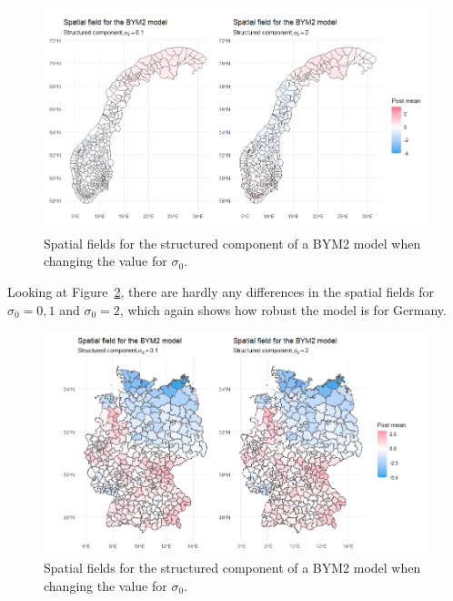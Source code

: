 \begin{figure}[H]
  \centering
  \includegraphics[width = \textwidth]{spatial_field_norway_3.png}
  \caption{Spatial fields for the structured component of a BYM2 model when changing the value for $\sigma_0$.}
  \label{comparison_norway_8}
\end{figure}
Looking at Figure~\ref{comparison_germany_8}, there are hardly any differences in the spatial fields for $\sigma_0=0,1$ and $\sigma_0=2$, which again shows how robust the model is for Germany.
\begin{figure}[H]
    \centering
    \includegraphics[width = \textwidth]{spatial_field_germany_3.png}
    \caption{Spatial fields for the structured component of a BYM2 model when changing the value for $\sigma_0$.}
    \label{comparison_germany_8}
\end{figure}

\clearpage
